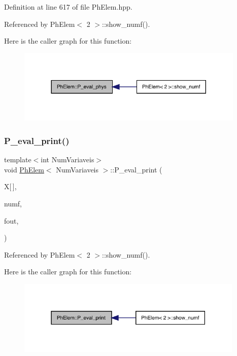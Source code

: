 Definition at line 617 of file Ph\+Elem.\+hpp.



Referenced by Ph\+Elem$<$ 2 $>$\+::show\+\_\+numf().

Here is the caller graph for this function\+:
\nopagebreak
\begin{figure}[H]
\begin{center}
\leavevmode
\includegraphics[width=308pt]{classPhElem_a638d823f66d1600cb948df872eb753c1_icgraph}
\end{center}
\end{figure}
\mbox{\label{classPhElem_ac5436d432516c731328134ac91b9a70b}} 
\subsubsection{\texorpdfstring{P\+\_\+eval\+\_\+print()}{P\_eval\_print()}}
{\footnotesize\ttfamily template$<$int Num\+Variaveis$>$ \\
void \hyperlink{classPhElem}{Ph\+Elem}$<$ Num\+Variaveis $>$\+::P\+\_\+eval\+\_\+print (\begin{DoxyParamCaption}\item[{const double}]{X\mbox{[}$\,$\mbox{]},  }\item[{const int \&}]{numf,  }\item[{F\+I\+LE $\ast$}]{fout,  }\item[{double($\ast$)(double, double, double)}]{ }\end{DoxyParamCaption})}



Referenced by Ph\+Elem$<$ 2 $>$\+::show\+\_\+numf().

Here is the caller graph for this function\+:
\nopagebreak
\begin{figure}[H]
\begin{center}
\leavevmode
\includegraphics[width=307pt]{classPhElem_ac5436d432516c731328134ac91b9a70b_icgraph}
\end{center}
\end{figure}
\mbox{\label{classPhElem_ac3bc9b0559e940faa2404b1541d0c403}} 

